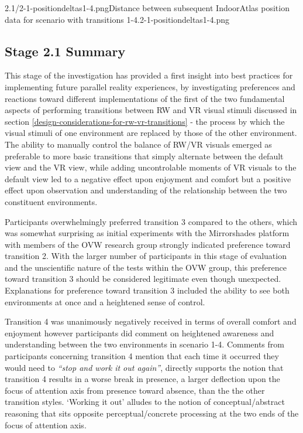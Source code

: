        {2.1/2-1-positiondeltas1-4.png}{Distance between subsequent IndoorAtlas position data for scenario with transitions 1-4.}{2-1-positiondeltas1-4.png}


\subsection{Stage 2.1 Summary}

This stage of the investigation has provided a first insight into best practices for implementing future parallel reality experiences, by investigating preferences and reactions toward different implementations of the first of the two fundamental aspects of performing transitions between RW and VR visual stimuli discussed in section \ref{design-considerations-for-rw-vr-transitions} - the process by which the visual stimuli of one environment are replaced by those of the other environment. The ability to manually control the balance of RW/VR visuals emerged as preferable to more basic transitions that simply alternate between the default view and the VR view, while adding uncontrolable moments of VR visuals to the default view led to a negative effect upon enjoyment and comfort but a positive effect upon observation and understanding of the relationship between the two constituent environments.

Participants overwhelmingly preferred transition 3 compared to the others, which was somewhat surprising as initial experiments with the Mirrorshades platform with members of the OVW research group strongly indicated preference toward transition 2. With the larger number of participants in this stage of evaluation and the unscientific nature of the tests within the OVW group, this preference toward transition 3 should be considered legitimate even though unexpected. Explanations for preference toward transition 3 included the ability to see both environments at once and a heightened sense of control.

Transition 4 was unanimously negatively received in terms of overall comfort and enjoyment however participants did comment on heightened awareness and understanding between the two environments in scenario 1-4. Comments from participants concerning transition 4 mention that each time it occurred they would need to \textit{``stop and work it out again''}, directly supports the notion that transition 4 results in a worse break in presence, a larger deflection upon the focus of attention axis from presence toward absence, than the the other transition styles. `Working it out' alludes to the notion of conceptual/abstract reasoning that sits opposite perceptual/concrete processing at the two ends of the focus of attention axis.

